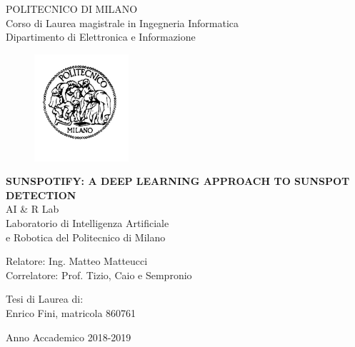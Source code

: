 \thispagestyle{empty}
\vspace*{-1.5cm} \bfseries{
\begin{center}
  \large
  POLITECNICO DI MILANO\\
  \normalsize
  Corso di Laurea magistrale in Ingegneria Informatica\\
  Dipartimento di Elettronica e Informazione\\
  \begin{figure}[htbp]
    \begin{center}
      \includegraphics[width=3.5cm]{./pictures/logopm}
    \end{center}
  \end{figure}
  \vspace*{0.3cm} \LARGE



  \textbf{SUNSPOTIFY: A DEEP LEARNING APPROACH TO SUNSPOT DETECTION}\\



  \vspace*{.75truecm} \large
  AI \& R Lab \\
  Laboratorio di Intelligenza Artificiale \\
  e Robotica del Politecnico di Milano
\end{center}
\vspace*{3.0cm} \large
\begin{flushleft}


  Relatore: Ing. Matteo Matteucci \\
  Correlatore: Prof. Tizio, Caio e Sempronio

\end{flushleft}
\vspace*{1.0cm}
\begin{flushright}


  Tesi di Laurea di:\\ Enrico Fini, matricola 860761\\ 


\end{flushright}
\vspace*{1.0cm}
\begin{center}



  Anno Accademico 2018-2019
\end{center} \clearpage
}

